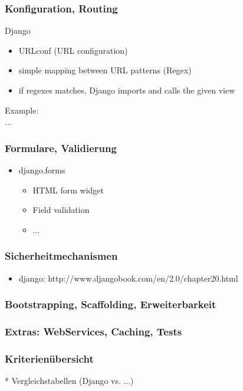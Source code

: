 \documentclass[
    t,
    smaller,
    compress,
]{beamer}
\begin{document}
\begin{frame}
  \frametitle{Konfiguration, Routing}
	Django
  	\begin{itemize}[<1->]
    	\item URLconf (URL configuration)
    	\item simple mapping between URL patterns (Regex)
    	\item if regexes matches, Django imports and calls the given view
  	 \end{itemize}
  
  Example: \\
...
  
  
\end{frame}


\begin{frame}
  \frametitle{Formulare, Validierung}
  
  \begin{itemize}[<1->]
    \item django.forms
	 \begin{itemize}[<1->]
		\item HTML form widget
		\item Field validation
		\item ...
	\end{itemize}
  \end{itemize}

\end{frame}


\begin{frame}
  \frametitle{Sicherheitmechanismen}
  
  \begin{itemize}[<1->]
    \item django: http://www.djangobook.com/en/2.0/chapter20.html
    \end{itemize}

\end{frame}


\begin{frame}
  \frametitle{Bootstrapping, Scaffolding, Erweiterbarkeit}
\end{frame}


\begin{frame}
  \frametitle{Extras: WebServices, Caching, Tests}
\end{frame}


\begin{frame}
  \frametitle{Kriterienübersicht}
 * Vergleichstabellen (Django vs. ...)
\end{frame}
\end{document}
